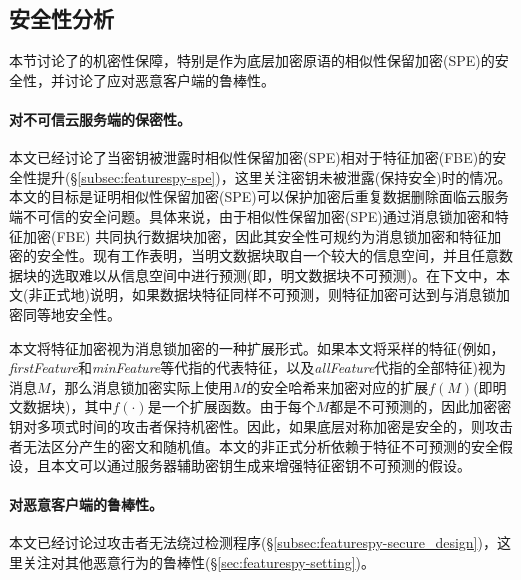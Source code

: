 
\subsection{安全性分析}
\label{subsec:featurespy-security}
本节讨论了\sysnameF 的机密性保障，特别是作为底层加密原语的相似性保留加密(SPE)的安全性，并讨论了\sysnameF 应对恶意客户端的鲁棒性。

\paragraph*{对不可信云服务端的保密性。}

本文已经讨论了当密钥被泄露时相似性保留加密(SPE)相对于特征加密(FBE)的安全性提升(\S\ref{subsec:featurespy-spe})，这里关注密钥未被泄露(保持安全)时的情况。本文的目标是证明相似性保留加密(SPE)可以保护加密后重复数据删除面临云服务端不可信的安全问题。具体来说，由于相似性保留加密(SPE)通过消息锁加密和特征加密(FBE) 共同执行数据块加密，因此其安全性可规约为消息锁加密和特征加密的安全性。现有工作\cite{bellare2013MLE}表明，当明文数据块取自一个较大的信息空间，并且任意数据块的选取难以从信息空间中进行预测(即，明文数据块不可预测)。在下文中，本文(非正式地)说明，如果数据块特征同样不可预测，则特征加密可达到与消息锁加密同等地安全性。

本文将特征加密视为消息锁加密的一种扩展形式。如果本文将采样的特征(例如，\textit{firstFeature}和\textit{minFeature}等代指的代表特征，以及\textit{allFeature}代指的全部特征)视为消息$M$，那么消息锁加密实际上使用$M$的安全哈希来加密对应的扩展$f(M)$(即明文数据块)，其中$f(\cdot)$是一个扩展函数。由于每个$M$都是不可预测的，因此加密密钥对多项式时间的攻击者保持机密性。因此，如果底层对称加密是安全的，则攻击者无法区分产生的密文和随机值。本文的非正式分析依赖于特征不可预测的安全假设，且本文可以通过服务器辅助密钥生成\cite{bellare2013DupLESS}来增强特征密钥不可预测的假设。

\paragraph*{对恶意客户端的鲁棒性。}
本文已经讨论过攻击者无法绕过检测程序(\S\ref{subsec:featurespy-secure_design})，这里关注\sysnameF 对其他恶意行为的鲁棒性(\S\ref{sec:featurespy-setting})。

